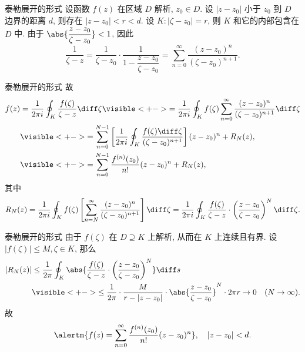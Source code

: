 \begin{frame}{泰勒展开的形式}
	\onslide<+->
	设函数 $f(z)$ 在区域 $D$ 解析, $z_0\in D$.
	\onslide<+->
	设 $|z-z_0|$ 小于 $z_0$ 到 $D$ 边界的距离 $d$,
	则存在 $|z-z_0|<r<d$.
	\onslide<+->
	设 $K:|\zeta-z_0|=r$, 则 $K$ 和它的内部包含在 $D$ 中.
	\onslide<+->
	由于 $\abs{\dfrac{z-z_0}{\zeta-z_0}}<1$, 因此
	\[\frac1{\zeta-z}=\frac1{\zeta-z_0}\cdot\frac1{1-\dfrac{z-z_0}{\zeta-z_0}}=\sum_{n=0}^\infty\frac{(z-z_0)^n}{(\zeta-z_0)^{n+1}}.\]

	\begin{center}
	\end{center}
\end{frame}


\begin{frame}{泰勒展开的形式}
	\onslide<+->
	故
	\begin{align*}
		f(z)&=\frac1{2\pi i}\oint_K \frac{f(\zeta)}{\zeta-z}\diff\zeta
		\visible<+->{=\frac1{2\pi i}\oint_K f(\zeta)\sum_{n=0}^\infty\frac{(z-z_0)^n}{(\zeta-z_0)^{n+1}}\diff\zeta}\\
		&\visible<+->{=
		\sum_{n=0}^{N-1}\left[\frac1{2\pi i}\oint_K\frac{f(\zeta)\diff\zeta}{(\zeta-z_0)^{n+1}}\right](z-z_0)^n+R_N(z),}\\
		&\visible<+->{=
		\sum_{n=0}^{N-1}\frac{f^{(n)}(z_0)}{n!}(z-z_0)^n+R_N(z),}
	\end{align*}
	\onslide<+->
	其中
	\[
		R_N(z)=\frac1{2\pi i}\oint_Kf(\zeta)\left[\sum_{n=N}^\infty\frac{(z-z_0)^n}{(\zeta-z_0)^{n+1}}\right]\diff\zeta
		=\frac1{2\pi i}\oint_K\frac{f(\zeta)}{\zeta-z}\cdot\left(\frac{z-z_0}{\zeta-z_0}\right)^N\diff\zeta.
	\]
\end{frame}


\begin{frame}{泰勒展开的形式}
	\onslide<+->
	由于 $f(\zeta)$ 在 $D\supseteq K$ 上解析, 从而在 $K$ 上连续且有界.
	\onslide<+->
	设 $|f(\zeta)|\le M,\zeta\in K$,
	\onslide<+->
	那么
	\begin{align*}
		|R_N(z)|&\le\frac 1{2\pi}\oint_K\abs{\frac{f(\zeta)}{\zeta-z}\cdot\left(\frac{z-z_0}{\zeta-z_0}\right)^N}\diff s\\
		&\visible<+->{\le\frac 1{2\pi}\cdot \frac M{r-|z-z_0|}\cdot\abs{\frac{z-z_0}{\zeta-z_0}}^N\cdot 2\pi r\to 0\quad (N\to\infty).}
	\end{align*}
	\onslide<+->
	故
	\[\alertm{f(z)=\sum_{n=0}^\infty\frac{f^{(n)}(z_0)}{n!}(z-z_0)^n},\quad |z-z_0|<d.\]
\end{frame}


